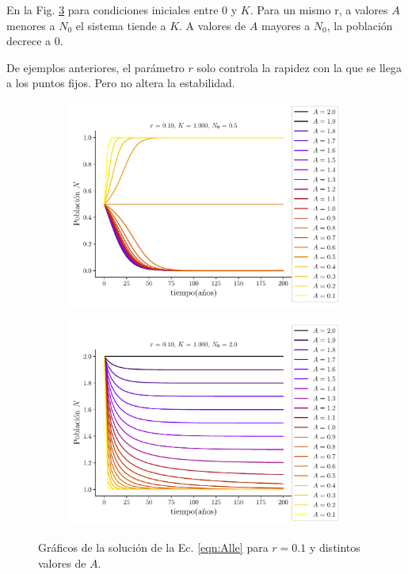 \documentclass[twocolumn,aps,prl]{revtex4-1}
\begin{document}
En la Fig. \ref{fig:scripts/plots/ex6-y0grande02} para condiciones iniciales entre 0 y $K$. Para un mismo r, a valores $A$ menores a $N_0$ el sistema tiende a $K$. A valores de $A$ mayores a $N_0$, la población decrece a 0. 

De ejemplos anteriores, el parámetro $r$ solo controla la rapidez con la que se llega a los puntos fijos. Pero no altera la estabilidad.

\begin{figure}[ht!]
    \centering
    \begin{subfigure}[b]{0.495\linewidth}
        \centering
        \includegraphics[width = 0.999\textwidth]{scripts/plots/ex6-y0chico02.pdf}
        \caption{}
        \label{fig:scripts/plots/ex6-y0chico02}
    \end{subfigure}
    \begin{subfigure}[b]{0.495\linewidth}
        \centering
        \includegraphics[width = 0.999\textwidth]{scripts/plots/ex6-y0grande02.pdf}
        \caption{}
        \label{fig:scripts/plots/ex6-y0grande02}
    \end{subfigure}
    \caption{Gráficos de la solución de la Ec. \ref{eqn:Alle} para $r=0.1$ y distintos valores de $A$.}
\end{figure}


\end{document}
